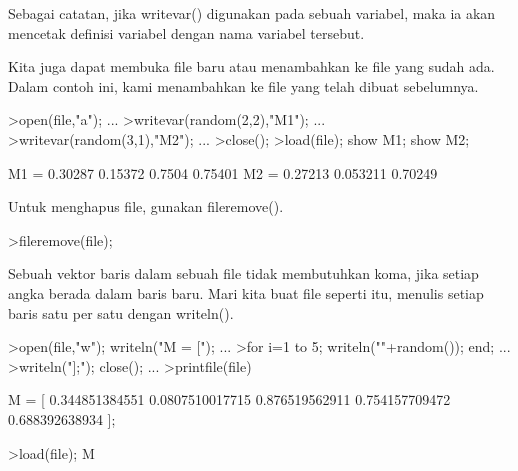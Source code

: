 \documentclass[12pt,Times new roman,letterpaper]{book}
\begin{document}
\begin{eulernootebook}
\begin{eulercomment}
\begin{eulercomment}
\begin{eulernootebook}
\begin{eulercomment}
\begin{eulercomment}
\begin{eulercomment}
\begin{eulercomment}
\begin{eulercomment}
\begin{eulercomment}
\begin{eulercomment}
\begin{eulercomment}
\begin{eulercomment}
\begin{eulercomment}
\begin{eulercomment}
\begin{eulercomment}
\begin{eulercomment}
\begin{eulercomment}
Sebagai catatan, jika writevar() digunakan pada sebuah variabel, maka
ia akan mencetak definisi variabel dengan nama variabel tersebut.
\end{eulercomment}
\begin{eulercomment}
Kita juga dapat membuka file baru atau menambahkan ke file yang sudah
ada. Dalam contoh ini, kami menambahkan ke file yang telah dibuat
sebelumnya.
\end{eulercomment}
\begin{eulerprompt}
>open(file,"a"); ...
>writevar(random(2,2),"M1"); ...
>writevar(random(3,1),"M2"); ...
>close();
>load(file); show M1; show M2;
\end{eulerprompt}
\begin{euleroutput}
  M1 = 
    0.30287   0.15372 
     0.7504   0.75401 
  M2 = 
    0.27213 
   0.053211 
    0.70249 
\end{euleroutput}
\begin{eulercomment}
Untuk menghapus file, gunakan fileremove().
\end{eulercomment}
\begin{eulerprompt}
>fileremove(file);
\end{eulerprompt}
\begin{eulercomment}
Sebuah vektor baris dalam sebuah file tidak membutuhkan koma, jika
setiap angka berada dalam baris baru. Mari kita buat file seperti itu,
menulis setiap baris satu per satu dengan writeln().
\end{eulercomment}
\begin{eulerprompt}
>open(file,"w"); writeln("M = ["); ...
>for i=1 to 5; writeln(""+random()); end; ...
>writeln("];"); close(); ...
>printfile(file)
\end{eulerprompt}
\begin{euleroutput}
  M = [
  0.344851384551
  0.0807510017715
  0.876519562911
  0.754157709472
  0.688392638934
  ];
\end{euleroutput}
\begin{eulerprompt}
>load(file); M
\end{eulerprompt}
\begin{euleroutput}

\end{euleroutput}
\end{eulercomment}
\end{eulercomment}
\end{eulercomment}
\end{eulercomment}
\end{eulercomment}
\end{eulercomment}
\end{eulercomment}
\end{eulercomment}
\end{eulercomment}
\end{eulercomment}
\end{eulercomment}
\end{eulercomment}
\end{eulercomment}
\end{eulernootebook}
\end{eulercomment}
\end{eulercomment}
\end{eulernootebook}
\end{document}
